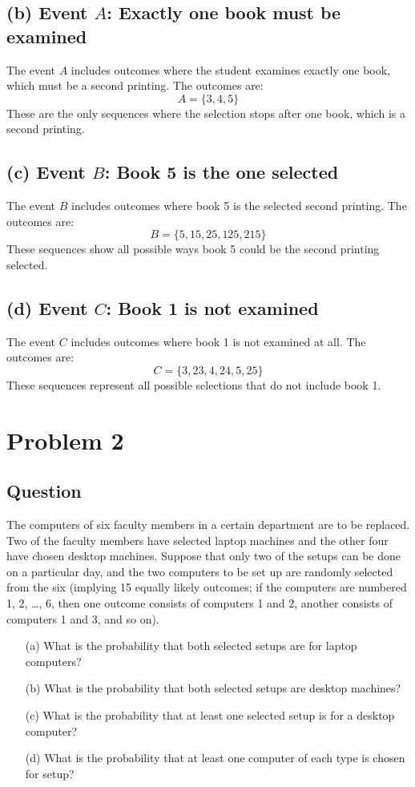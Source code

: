 \documentclass{article}
\begin{document}
\subsection*{(b) Event $A$: Exactly one book must be examined}
The event $A$ includes outcomes where the student examines exactly one book, which must be a second printing. The outcomes are:
\[
A = \{3, 4, 5\}
\]
These are the only sequences where the selection stops after one book, which is a second printing.

\subsection*{(c) Event $B$: Book 5 is the one selected}
The event $B$ includes outcomes where book 5 is the selected second printing. The outcomes are:
\[
B = \{5, 15, 25, 125, 215\}
\]
These sequences show all possible ways book 5 could be the second printing selected.

\subsection*{(d) Event $C$: Book 1 is not examined}
The event $C$ includes outcomes where book 1 is not examined at all. The outcomes are:
\[
C = \{3, 23, 4, 24, 5, 25\}
\]
These sequences represent all possible selections that do not include book 1.

\section*{Problem 2}
\subsection*{Question}
The computers of six faculty members in a certain department are to be replaced. Two of the faculty members have selected laptop machines and the other four have chosen desktop machines. Suppose that only two of the setups can be done on a particular day, and the two computers to be set up are randomly selected from the six (implying 15 equally likely outcomes; if the computers are numbered 1, 2, \ldots, 6, then one outcome consists of computers 1 and 2, another consists of computers 1 and 3, and so on).

\begin{enumerate}
    \item[(a)] What is the probability that both selected setups are for laptop computers?
    \item[(b)] What is the probability that both selected setups are desktop machines?
    \item[(c)] What is the probability that at least one selected setup is for a desktop computer?
    \item[(d)] What is the probability that at least one computer of each type is chosen for setup?
\end{enumerate}
\end{document}
